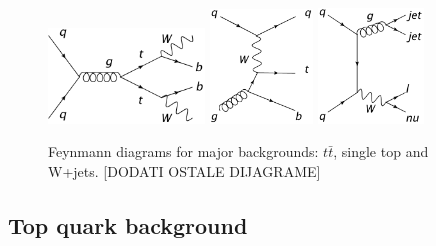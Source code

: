 \begin{figure}[htbp]
	\centering
		\includegraphics[width=0.37\textwidth]{Figures/FD-tt.png}
		\includegraphics[width=0.245\textwidth]{Figures/FD-st.png}
		\includegraphics[width=0.25\textwidth]{Figures/FD-WJ.png}
	\caption[Feynmann diagrams showing major backgrounds]{Feynmann diagrams for major backgrounds: $t\bar{t}$, single top and W+jets. [DODATI OSTALE DIJAGRAME]}
	\label{fig:backgrounds}
\end{figure}

\subsection{Top quark background}

